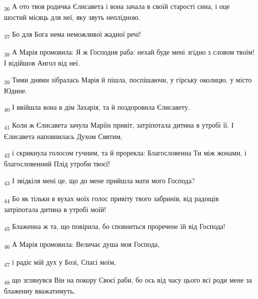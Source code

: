 \begin{tcolorbox}
\textsubscript{36} А ото твоя родичка Єлисавета і вона зачала в своїй старості сина, і оце шостий місяць для неї, яку звуть неплідною.
\end{tcolorbox}
\begin{tcolorbox}
\textsubscript{37} Бо для Бога нема неможливої жадної речі!
\end{tcolorbox}
\begin{tcolorbox}
\textsubscript{38} А Марія промовила: Я ж Господня раба: нехай буде мені згідно з словом твоїм! І відійшов Ангол від неї.
\end{tcolorbox}
\begin{tcolorbox}
\textsubscript{39} Тими днями зібралась Марія й пішла, поспішаючи, у гірську околицю, у місто Юдине.
\end{tcolorbox}
\begin{tcolorbox}
\textsubscript{40} І ввійшла вона в дім Захарія, та й поздоровила Єлисавету.
\end{tcolorbox}
\begin{tcolorbox}
\textsubscript{41} Коли ж Єлисавета зачула Маріїн привіт, затріпотала дитина в утробі її. І Єлисавета наповнилась Духом Святим,
\end{tcolorbox}
\begin{tcolorbox}
\textsubscript{42} і скрикнула голосом гучним, та й прорекла: Благословенна Ти між жонами, і благословенний Плід утроби твоєї!
\end{tcolorbox}
\begin{tcolorbox}
\textsubscript{43} І звідкіля мені це, що до мене прийшла мати мого Господа?
\end{tcolorbox}
\begin{tcolorbox}
\textsubscript{44} Бо як тільки в вухах моїх голос привіту твого забринів, від радощів затріпотала дитина в утробі моїй!
\end{tcolorbox}
\begin{tcolorbox}
\textsubscript{45} Блаженна ж та, що повірила, бо сповниться проречене їй від Господа!
\end{tcolorbox}
\begin{tcolorbox}
\textsubscript{46} А Марія промовила: Величає душа моя Господа,
\end{tcolorbox}
\begin{tcolorbox}
\textsubscript{47} і радіє мій дух у Бозі, Спасі моїм,
\end{tcolorbox}
\begin{tcolorbox}
\textsubscript{48} що зглянувся Він на покору Своєї раби, бо ось від часу цього всі роди мене за блаженну вважатимуть,
\end{tcolorbox}
